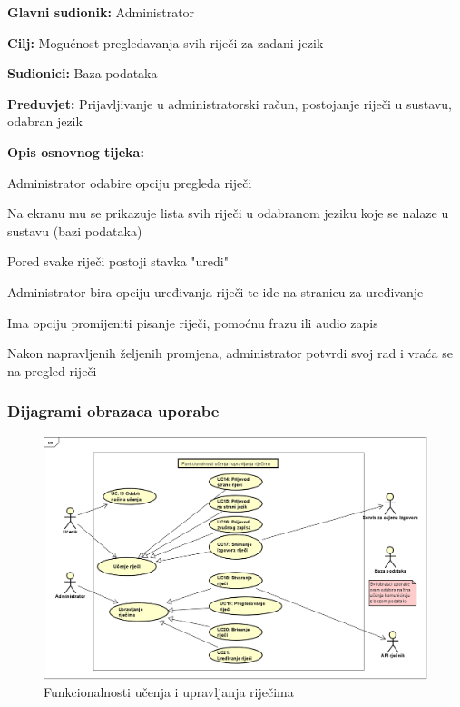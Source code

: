 \noindent {}
\begin{packed_item}

	\item \textbf{Glavni sudionik: } Administrator
	\item \textbf{Cilj: } Mogućnost pregledavanja svih riječi za zadani jezik
	\item \textbf{Sudionici: } Baza podataka
	\item \textbf{Preduvjet: } Prijavljivanje u administratorski račun, postojanje riječi u sustavu, odabran jezik
	\item  \textbf{Opis osnovnog tijeka:}
	
	\item[] \begin{packed_enum}
		
		\item Administrator odabire opciju pregleda riječi
		\item Na ekranu mu se prikazuje lista svih riječi u odabranom jeziku koje se nalaze u sustavu (bazi podataka)
		\item Pored svake riječi postoji stavka "uredi"
		\item Administrator bira opciju uređivanja riječi te ide na stranicu za uređivanje
		\item Ima opciju promijeniti pisanje riječi, pomoćnu frazu ili audio zapis
		\item Nakon napravljenih željenih promjena, administrator potvrdi svoj rad i vraća se na pregled riječi

	\end{packed_enum}
	
\end{packed_item}

\eject


\subsubsection{Dijagrami obrazaca uporabe}

\begin{figure}[H]
	\includegraphics[scale=0.6]{dijagrami/upravljanje_rijecima.png} 
	\centering
	\caption{Funkcionalnosti učenja i upravljanja riječima}
	\label{fig:dijagram1}
\end{figure}

